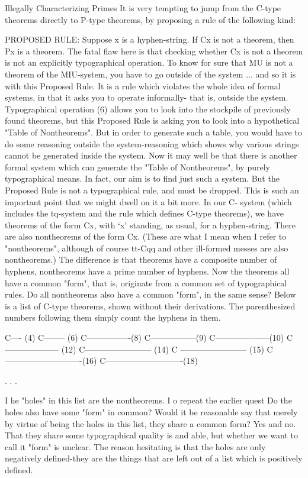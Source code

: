 Illegally Characterizing Primes It is very tempting to jump from the C-type theorems directly to P-type theorems, by proposing a rule of the following kind: 

PROPOSED RULE: Suppose x is a hyphen-string. If Cx is not a theorem, then Px is a theorem. The fatal flaw here is that checking whether Cx is not a theorem is not an explicitly typographical operation. To know for sure that MU is not a theorem of the MIU-system, you have to go outside of the system ... and so it is with this Proposed Rule. It is a rule which violates the whole idea of formal systems, in that it asks you to operate informally- that is, outside the system. Typographical operation (6) allows you to look into the stockpile of previously found theorems, but this Proposed Rule is asking you to look into a hypothetical "Table of Nontheorems". But in order to generate such a table, you would have to do some reasoning outside the system-reasoning which shows why various strings cannot be generated inside the system. Now it may well be that there is another formal system which can generate the "Table of Nontheorems", by purely typographical means. In fact, our aim is to find just such a system. But the Proposed Rule is not a typographical rule, and must be dropped. This is such an important point that we might dwell on it a bit more. In our C- system (which includes the tq-system and the rule which defines C-type theorems), we have theorems of the form Cx, with `x' standing, as usual, for a hyphen-string. There are also nontheorems of the form Cx. (These are what I mean when I refer to "nontheorems", although of course tt-Cqq and other ill-formed messes are also nontheorems.) The difference is that theorems have a composite number of hyphens, nontheorems have a prime number of hyphens. Now the theorems all have a common "form", that is, originate from a common set of typographical rules. Do all nontheorems also have a common "form", in the same sense? Below is a list of C-type theorems, shown without their derivations. The parenthesized numbers following them simply count the hyphens in them. 

C---- (4) C-------- (6) C----------------(8) C-----------------(9) C--------------------(10) C -------------------- (12) C------------------------ (14) C ------------------------ (15) C----------------------------(16) C----------------------------(18) 



. . . 

I he "holes" in this list are the nontheorems. I o repeat the earlier quest Do the holes also have some "form" in common? Would it be reasonable say that merely by virtue of being the holes in this list, they share a common form? Yes and no. That they share some typographical quality is and able, but whether we want to call it "form" is unclear. The reason hesitating is that the holes are only negatively defined-they are the things that are left out of a list which is positively defined. 

